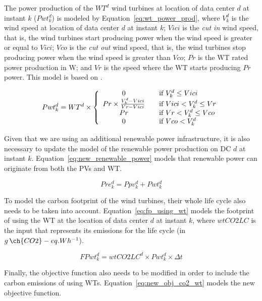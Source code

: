 The power production of the $WT^d$ wind turbines at location of data center $d$ at instant $k$ ($Pwt^d_{k}$) is modeled by Equation~\ref{eq:wt_power_prod}, where $V^d_k$ is the wind speed at location of data center $d$ at instant $k$; $Vici$ is the \textit{cut in} wind speed, that is, the wind turbines start producing power when the wind speed is greater or equal to $Vici$; $Vco$ is the \textit{cut out} wind speed, that is, the wind turbines stop producing power when the wind speed is greater than $Vco$; $Pr$ is the WT rated power production in W; and $Vr$ is the speed where the WT starts producing $Pr$ power. This model is based on \cite{HADDAD2021100505}.


\begin{equation} \label{eq:wt_power_prod}
Pwt^d_{k} = WT^d \times \left\{ 
  \begin{array}{ c l }
    0   & \quad \textrm{if } V^d_k \leq Vici \\
    Pr \times \frac{V^d_k - Vici}{Vr - Vici}  & \quad \textrm{if } Vici < V^d_k \leq Vr \\
    Pr  & \quad \textrm{if } Vr < V^d_k \leq Vco \\
    0  & \quad \textrm{if } Vco < V^d_k \\
  \end{array}
\right.
\end{equation}


Given that we are using an additional renewable power infrastructure, it is also necessary to update the model of the renewable power production on DC $d$ at instant $k$. Equation~\eqref{eq:new_renewable_power} models that renewable power can originate from both the PVs and WT.

\begin{equation} \label{eq:new_renewable_power}
    Pre^d_{k}= Ppv^d_{k} + Pwt^d_{k}
\end{equation}


To model the carbon footprint of the wind turbines, their whole life cycle also needs to be taken into account. Equation~\eqref{eq:fp_using_wt} models the footprint of using the WT at the location of data center $d$ at instant $k$, where $wtCO2LC$ is the input that represents its emissions for the life cycle (in $g\,\ch{CO2}-eq.Wh^{-1}$).

\begin{equation}\label{eq:fp_using_wt}
   FPwt^d_k =  wtCO2LC^d \times Pwt^d_{k}\times \Delta t
\end{equation}

Finally, the objective function also needs to be modified in order to include the carbon emissions of using WTs. Equation~\ref{eq:new_obj_co2_wt} models the new objective function.

